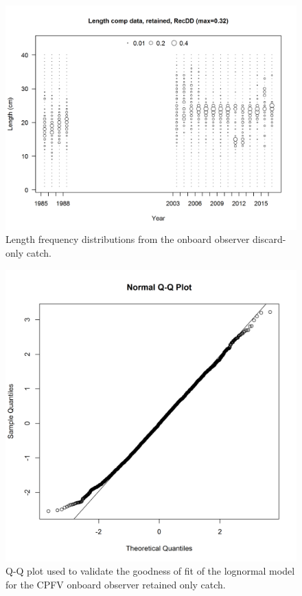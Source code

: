 \documentclass[12pt,]{article}
\begin{document}
\begin{figure}[htbp]
\centering
\includegraphics{r4ss/plots_mod1/comp_lendat_bubflt6mkt2.png}
\caption{Length frequency distributions from the onboard observer
discard-only catch. \label{fig:Fleet6_comp_lendat_bubflt6mkt2}}
\end{figure}

\begin{figure}[htbp]
\centering
\includegraphics{Figures/Fleet12_RecPCOB_QQ.png}
\caption{Q-Q plot used to validate the goodness of fit of the lognormal
model for the CPFV onboard observer retained only catch.
\label{fig:Fleet12_RecPCOBR_QQ}}
\end{figure}
\end{document}
